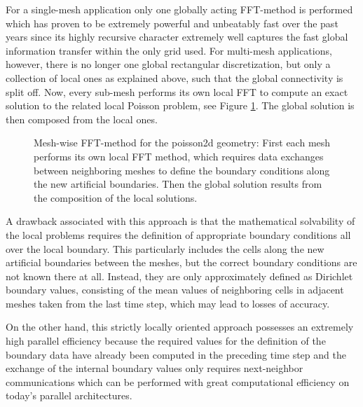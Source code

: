 For a single-mesh application only one globally acting FFT-method is performed which has proven to be extremely powerful and unbeatably fast over the past years since its highly recursive character extremely well captures the fast global information transfer within the only grid used. For multi-mesh applications, however, there is no longer one global rectangular discretization, but only a collection of local ones as explained above, such that the global connectivity is split off. Now, every sub-mesh performs its own local FFT to compute an exact solution to the related local Poisson problem, see Figure \ref{FIG_local_ffts}. 
The global solution is then composed from the local ones.
\begin{figure}[h]
\begin{center}

\caption[Mesh-wise FFT-method]{Mesh-wise FFT-method for the {\ct poisson2d} geometry: First each mesh performs its own local FFT method, which requires data exchanges between neighboring meshes to define the boundary conditions along the new artificial boundaries. Then the global solution results from the composition of the local solutions.}
\label{FIG_local_ffts}
\end{center}
\end{figure}

\vspace{-0.3cm}
A drawback associated with this approach is that the mathematical solvability of the local problems requires the definition of appropriate boundary conditions all over the local boundary. This particularly includes the cells along the new artificial boundaries between the meshes, but the correct boundary conditions are not known there at all. Instead, they are only approximately defined as Dirichlet boundary values, consisting of the mean values of neighboring cells in adjacent meshes taken from the last time step, which may lead to losses of accuracy.

On the other hand, this strictly locally oriented approach possesses an extremely high parallel efficiency because the required values for the definition of the boundary data have already been computed in the preceding time step and the exchange of the internal boundary values only requires next-neighbor communications which can be performed with great computational efficiency on today's parallel architectures.


